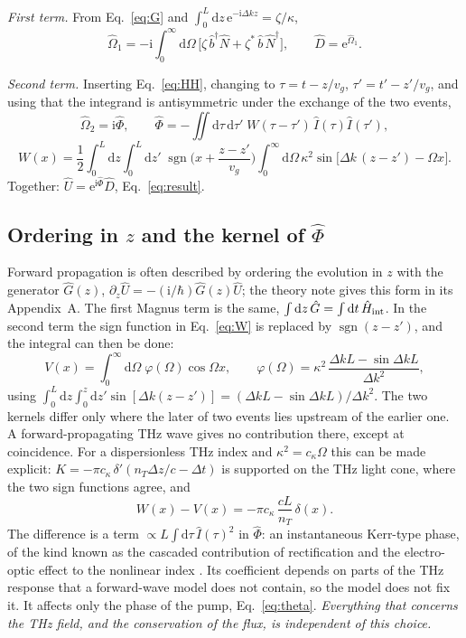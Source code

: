 \documentclass[aps,pra,onecolumn,notitlepage,11pt,amsmath,amssymb,nofootinbib]{revtex4-2}
\newcommand{\Nop}{\hat N}
\newcommand{\Iop}{\hat I}
\newcommand{\dd}{\mathrm{d}}
\newcommand{\ee}{\mathrm{e}}
\newcommand{\ii}{\mathrm{i}}
\newcommand{\sgn}{\operatorname{sgn}}
\begin{document}
\emph{First term.} From Eq.~\eqref{eq:G} and
$\int_0^L\dd z\,\ee^{-\ii\Delta kz}=\zeta/\kappa$,
\begin{equation}
\hat\Omega_1=-\ii\int_0^\infty\!\!\dd\Omega\,
\big[\zeta\,\hat b^\dagger\Nop+\zeta^*\,\hat b\,\Nop^\dagger\big],
\qquad \hat D=\ee^{\hat\Omega_1}.
\end{equation}

\emph{Second term.} Inserting Eq.~\eqref{eq:HH}, changing to
$\tau=t-z/v_g$, $\tau'=t'-z'/v_g$, and using that the integrand is
antisymmetric under the exchange of the two events,
\begin{equation}
\hat\Omega_2=\ii\hat\Phi,\qquad
\hat\Phi=-\iint\!\dd\tau\,\dd\tau'\;W(\tau-\tau')\,\Iop(\tau)\Iop(\tau'),
\label{eq:Phi}
\end{equation}
\begin{equation}
W(x)=\frac12\int_0^L\!\!\dd z\!\int_0^L\!\!\dd z'\;
\sgn\!\Big(x+\frac{z-z'}{v_g}\Big)
\int_0^\infty\!\!\dd\Omega\,\kappa^2\sin\!\big[\Delta k\,(z-z')-\Omega x\big].
\label{eq:W}
\end{equation}
Together: $\hat U=\ee^{\ii\hat\Phi}\hat D$, Eq.~\eqref{eq:result}.

\subsection{Ordering in $z$ and the kernel of $\hat\Phi$}

Forward propagation is often described by ordering the evolution in $z$ with
the generator $\hat G(z)$, $\partial_z\hat U=-(\ii/\hbar)\hat G(z)\hat U$; the
theory note gives this form in its Appendix~A. The first Magnus term is the same,
$\int\dd z\,\hat G=\int\dd t\,\hat H_{\rm int}$. In the second term the sign
function in Eq.~\eqref{eq:W} is replaced by $\sgn(z-z')$, and the integral can
then be done:
\begin{equation}
V(x)=\int_0^\infty\!\!\dd\Omega\;\varphi(\Omega)\cos\Omega x,\qquad
\varphi(\Omega)=\kappa^2\,\frac{\Delta kL-\sin\Delta kL}{\Delta k^2},
\label{eq:V}
\end{equation}
using $\int_0^L\dd z\int_0^z\dd z'\sin[\Delta k(z-z')]
=(\Delta kL-\sin\Delta kL)/\Delta k^2$. The two kernels differ only where the
later of two events lies upstream of the earlier one. A forward-propagating
THz wave gives no contribution there, except at coincidence. For a
dispersionless THz index and $\kappa^2=c_\kappa\Omega$ this can be made
explicit: $K=-\pi c_\kappa\,\delta'(n_T\Delta z/c-\Delta t)$ is supported on
the THz light cone, where the two sign functions agree, and
\begin{equation}
W(x)-V(x)=-\pi c_\kappa\,\frac{cL}{n_T}\,\delta(x).
\end{equation}
The difference is a term $\propto L\int\dd\tau\,\Iop(\tau)^2$ in $\hat\Phi$:
an instantaneous Kerr-type phase, of the kind known as the cascaded
contribution of rectification and the electro-optic effect to the nonlinear
index \cite{caumes2002}. Its coefficient depends on parts of the THz response
that a forward-wave model does not contain, so the model does not fix it. It
affects only the phase of the pump, Eq.~\eqref{eq:theta}. \emph{Everything
that concerns the THz field, and the conservation of the flux, is independent
of this choice.}
\end{document}
